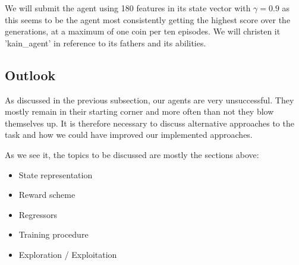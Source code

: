 We will submit the agent using 180 features in its state vector with $\gamma=0.9$ as this seems to be the agent most consistently getting the highest score over the generations, at a maximum of one coin per ten episodes. We will christen it 'kain_agent' in reference to its fathers and its abilities.

\subsection{Outlook}
As discussed in the previous subsection, our agents are very unsuccessful. They mostly remain in their starting corner and more often than not they blow themselves up. It is therefore necessary to discuss alternative approaches to the task and how we could have improved our implemented approaches.\par


As we see it, the topics to be discussed are mostly the sections above:
\begin{itemize}
	\item State representation
	\item Reward scheme
	\item Regressors
	\item Training procedure
	\item Exploration / Exploitation
\end{itemize}

